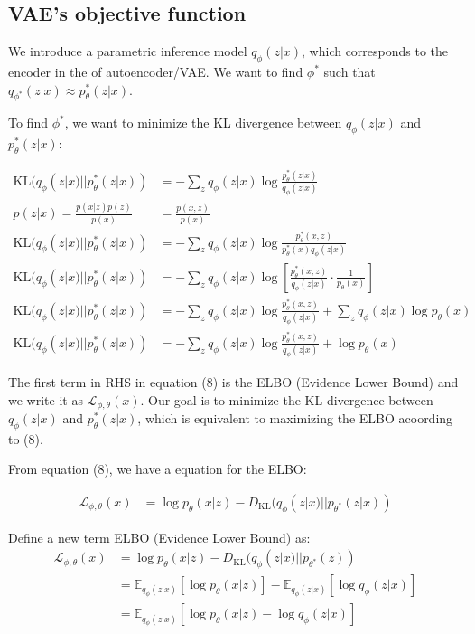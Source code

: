 \documentclass[11pt]{article}
\theoremstyle{definition}
\begin{document}
\subsection{VAE's objective function}

We introduce a parametric inference model $q_\phi(z|x)$, which corresponds to the encoder in the of autoencoder/VAE. We want to find $\phi^*$ such that $q_{\phi^*}(z|x) \approx p_\theta^*(z|x)$.

To find $\phi^*$, we want to minimize the KL divergence between $q_\phi(z|x)$ and $p_\theta^*(z|x)$:

\begin{align}
    \text{KL}(q_\phi(z|x)||p_\theta^*(z|x)) &= -\sum_{z} q_\phi(z|x) \log \frac{p_\theta^*(z|x)}{q_\phi(z|x)} \\
    p(z|x) = \frac{p(x|z) p(z)}{p(x)} &= \frac{p(x, z)}{p(x)}\\
    \text{KL}(q_\phi(z|x)||p_\theta^*(z|x)) &= -\sum_{z} q_\phi(z|x) \log \frac{p_\theta^*(x, z)}{p_\theta^*(x)q_\phi(z|x)} \\
    \text{KL}(q_\phi(z|x)||p_\theta^*(z|x)) &= -\sum_{z} q_\phi(z|x) \log \left[ \frac{p_\theta^*(x, z)}{q_\phi(z|x)}\cdot\frac{1}{p_\theta(x)}\right] \\
    \text{KL}(q_\phi(z|x)||p_\theta^*(z|x)) &= -\sum_{z} q_\phi(z|x) \log \frac{p_\theta^*(x, z)}{q_\phi(z|x)} + \sum_{z} q_\phi(z|x) \log p_\theta(x) \\
    \text{KL}(q_\phi(z|x)||p_\theta^*(z|x)) &= -\sum_{z} q_\phi(z|x) \log \frac{p_\theta^*(x, z)}{q_\phi(z|x)} + \log p_\theta(x)
\end{align}

The first term in RHS in equation (8) is the ELBO (Evidence Lower Bound) and we write it as $\mathcal{L}_{\phi, \theta}(x)$. Our goal is to minimize the KL divergence between $q_\phi(z|x)$ and $p_\theta^*(z|x)$, which is equivalent to maximizing the ELBO acoording to (8).

From equation (8), we have a equation for the ELBO:

\begin{align}
    \mathcal{L}_{\phi, \theta}(x) &= \log p_\theta(x|z) - D_\text{KL}(q_\phi(z|x)||p_{\theta^*}(z|x))
\end{align}


Define a new term ELBO (Evidence Lower Bound) as: 
\begin{align}
    \mathcal{L}_{\phi, \theta}(x) &= \log p_\theta(x|z) - D_\text{KL}(q_\phi(z|x)||p_{\theta^*}(z))\\
    &= \mathbb{E}_{q_\phi(z|x)}[\log p_\theta(x|z)] - \mathbb{E}_{q_\phi(z|x)}[\log q_\phi(z|x)]\\
    &= \mathbb{E}_{q_\phi(z|x)}[\log p_\theta(x|z) - \log q_\phi(z|x)]
\end{align}
\end{document}
